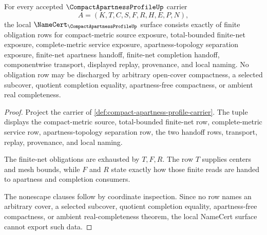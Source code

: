 \begin{theorem}
\label{thm:compact-apartness-profile-namecert-obligations}
For every accepted $\CompactApartnessProfileUp$ carrier
$$
A=(K,T,C,S,F,R,H,E,P,N),
$$
the local $\NameCert_{\CompactApartnessProfileUp}$ surface consists exactly of finite obligation rows for compact-metric source exposure, total-bounded finite-net exposure, complete-metric service exposure, apartness-topology separation exposure, finite-net apartness handoff, finite-net completion handoff, componentwise transport, displayed replay, provenance, and local naming. No obligation row may be discharged by arbitrary open-cover compactness, a selected subcover, quotient completion equality, apartness-free compactness, or ambient real completeness.
\end{theorem}
\begin{proof}
Project the carrier of \autoref{def:compact-apartness-profile-carrier}. The tuple displays the compact-metric source, total-bounded finite-net row, complete-metric service row, apartness-topology separation row, the two handoff rows, transport, replay, provenance, and local naming.

The finite-net obligations are exhausted by $T,F,R$. The row $T$ supplies centers and mesh bounds, while $F$ and $R$ state exactly how those finite reads are handed to apartness and completion consumers.

The nonescape clauses follow by coordinate inspection. Since no row names an arbitrary cover, a selected subcover, quotient completion equality, apartness-free compactness, or ambient real-completeness theorem, the local NameCert surface cannot export such data.
\end{proof}

